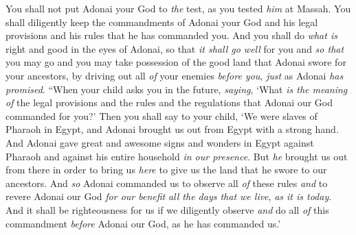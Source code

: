 \begin{biblechapter}
\verse You shall not put Adonai your God to \textit{the} test, as you tested \textit{him} at Massah.
\verse You shall diligently keep the commandments of Adonai your God and his legal provisions and his rules that he has commanded you.
\verse And you shall do \textit{what is} right and good in the eyes of Adonai, so that \textit{it shall go well} for you and \textit{so that} you may go and you may take possession of the good land that Adonai swore for your ancestors,
\verse by driving out all \textit{of} your enemies \textit{before you}, \textit{just} as Adonai \textit{has promised}.
\verse “When your child asks you in the future, \textit{saying}, ‘What \textit{is the meaning of} the legal provisions and the rules and the regulations that Adonai our God commanded for you?’
\verse Then you shall say to your child, ‘We were slaves of Pharaoh in Egypt, and Adonai brought us out from Egypt with a strong hand.
\verse And Adonai gave great and awesome signs and wonders in Egypt against Pharaoh and against his entire household \textit{in our presence}.
\verse But \textit{he} brought us out from there in order to bring us \textit{here} to give us the land that he swore to our ancestors.
\verse And \textit{so} Adonai commanded us to observe all \textit{of} these rules \textit{and} to revere Adonai our God \textit{for our benefit} \textit{all the days that we live}, \textit{as it is today}.
\verse And it shall be righteousness for us if we diligently observe \textit{and} do all \textit{of} this commandment \textit{before} Adonai our God, as he has commanded us.’
\end{biblechapter}

